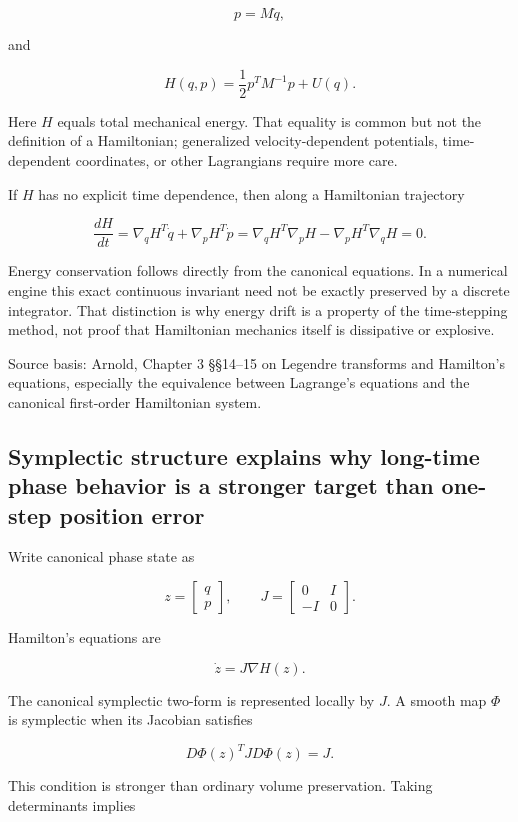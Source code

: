 \[
p=M\dot q,
\]

and

\[
H(q,p)
=
\frac12p^TM^{-1}p+U(q).
\]

Here \(H\) equals total mechanical energy. That equality is common but not the definition of a Hamiltonian; generalized velocity-dependent potentials, time-dependent coordinates, or other Lagrangians require more care.

If \(H\) has no explicit time dependence, then along a Hamiltonian trajectory

\[
\frac{dH}{dt}
=
\nabla_qH^T\dot q
+
\nabla_pH^T\dot p
=
\nabla_qH^T\nabla_pH
-
\nabla_pH^T\nabla_qH
=
0.
\]

Energy conservation follows directly from the canonical equations. In a numerical engine this exact continuous invariant need not be exactly preserved by a discrete integrator. That distinction is why energy drift is a property of the time-stepping method, not proof that Hamiltonian mechanics itself is dissipative or explosive.

Source basis: Arnold, Chapter 3 §§14--15 on Legendre transforms and Hamilton's equations, especially the equivalence between Lagrange's equations and the canonical first-order Hamiltonian system.

\subsection{Symplectic structure explains why long-time phase behavior is a stronger target than one-step position error}\label{symplectic-structure-explains-why-long-time-phase-behavior-is-a-stronger-target-than-one-step-position-error}

Write canonical phase state as

\[
z=
\begin{bmatrix}
q\\p
\end{bmatrix},
\qquad
J=
\begin{bmatrix}
0&I\\
-I&0
\end{bmatrix}.
\]

Hamilton's equations are

\[
\dot z
=
J\nabla H(z).
\]

The canonical symplectic two-form is represented locally by \(J\). A smooth map \(\Phi\) is symplectic when its Jacobian satisfies

\[
D\Phi(z)^T J D\Phi(z)=J.
\]

This condition is stronger than ordinary volume preservation. Taking determinants implies

